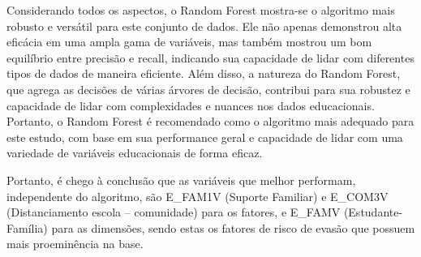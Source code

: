 Considerando todos os aspectos, o Random Forest mostra-se o algoritmo mais robusto e versátil para este conjunto de dados. Ele não apenas demonstrou alta eficácia em uma ampla gama de variáveis, mas também mostrou um bom equilíbrio entre precisão e recall, indicando sua capacidade de lidar com diferentes tipos de dados de maneira eficiente. Além disso, a natureza do Random Forest, que agrega as decisões de várias árvores de decisão, contribui para sua robustez e capacidade de lidar com complexidades e nuances nos dados educacionais. Portanto, o Random Forest é recomendado como o algoritmo mais adequado para este estudo, com base em sua performance geral e capacidade de lidar com uma variedade de variáveis educacionais de forma eficaz.

Portanto, é chego à conclusão que as variáveis que melhor performam, independente do algoritmo, são  E\_FAM1V (Suporte Familiar) e E\_COM3V (Distanciamento escola – comunidade) para os fatores, e E\_FAMV (Estudante-Família) para as dimensões, sendo estas os fatores de risco de evasão que possuem mais proeminência na base.





